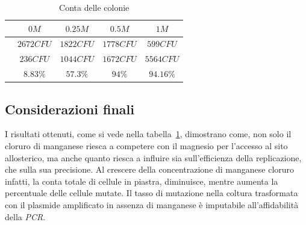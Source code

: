 	\begin{table}[H]
		\centering
		\begin{tabular}{|c|c|c|c|c|}
			\hline
			\makecell{Concentrazione di \emph{$MnCl_2$}} & $0M$ & $0.25M$ & $0.5M$ & $1M$\\
			\hline
			\makecell{Conta totale} & $2672CFU$ & $1822CFU$ & $1778CFU$ & $599CFU$ \\
			\hline
			\makecell{Colonie mutate} & $236CFU$ & $1044CFU$ & $1672CFU$ & $5564CFU$\\
			\hline
			\makecell{Tasso di mutazione} & $8.83\%$ & $57.3\%$ & $94\%$ & $94.16\%$\\
			\hline
		\end{tabular}
		\caption{Conta delle colonie}
		\label{tab}
	\end{table}

	\subsection*{Considerazioni finali}
	I risultati ottenuti, come si vede nella tabella~\ref{tab}, dimostrano come, non solo il cloruro di manganese riesca a competere con il magnesio per l'accesso al sito allosterico,
        ma anche quanto riesca a influire sia sull'efficienza della replicazione, che sulla sua precisione.
        Al crescere della concentrazione di manganese cloruro infatti, la conta totale di cellule in piastra, diminuisce, mentre aumenta la percentuale delle cellule mutate.
	Il tasso di mutazione nella coltura trasformata con il plasmide amplificato in assenza di manganese \`e imputabile all'affidabilit\`a della \emph{PCR}.

